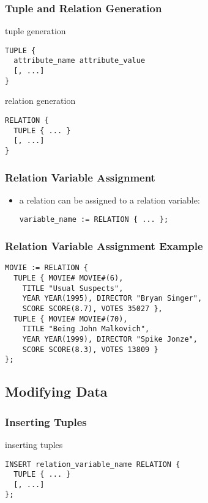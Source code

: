 \documentclass[dvipsnames]{beamer}
\theoremstyle{plain}
\begin{document}
\begin{frame}[fragile]
  \frametitle{Tuple and Relation Generation}

  \begin{block}{tuple generation}
    \begin{lstlisting}
TUPLE {
  attribute_name attribute_value
  [, ...]
}
    \end{lstlisting}
  \end{block}

  \pause
  \begin{block}{relation generation}
    \begin{lstlisting}
RELATION {
  TUPLE { ... }
  [, ...]
}
    \end{lstlisting}
  \end{block}
\end{frame}

\begin{frame}[fragile]
  \frametitle{Relation Variable Assignment}

  \begin{itemize}
    \item a relation can be assigned to a relation variable:
    \begin{lstlisting}
variable_name := RELATION { ... };
    \end{lstlisting}
  \end{itemize}
\end{frame}

\begin{frame}[fragile]
  \frametitle{Relation Variable Assignment Example}

  \begin{example}
    \begin{lstlisting}
MOVIE := RELATION {
  TUPLE { MOVIE# MOVIE#(6),
    TITLE "Usual Suspects",
    YEAR YEAR(1995), DIRECTOR "Bryan Singer",
    SCORE SCORE(8.7), VOTES 35027 },
  TUPLE { MOVIE# MOVIE#(70),
    TITLE "Being John Malkovich",
    YEAR YEAR(1999), DIRECTOR "Spike Jonze",
    SCORE SCORE(8.3), VOTES 13809 }
};
    \end{lstlisting}
  \end{example}
\end{frame}

\subsection{Modifying Data}

\begin{frame}[fragile]
  \frametitle{Inserting Tuples}

  \begin{block}{inserting tuples}
    \begin{lstlisting}
INSERT relation_variable_name RELATION {
  TUPLE { ... }
  [, ...]
};
    \end{lstlisting}
  \end{block}
\end{frame}
\end{document}
